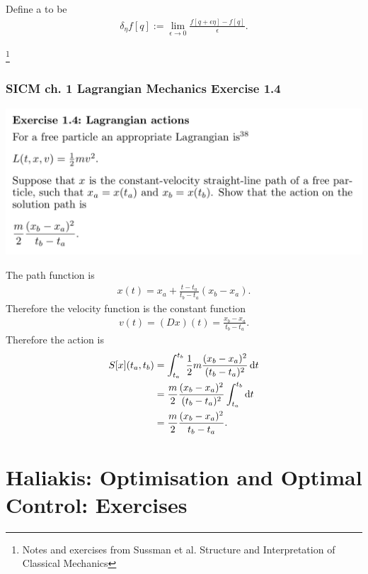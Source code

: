 Define a  to be
\begin{align*}
  \delta_{\eta}f[q] := \lim_{\epsilon \to 0} \frac{f[q + \epsilon\eta] - f[q]}{\epsilon}.
\end{align*}

\newpage
\footnote{Notes and exercises from Sussman et al. Structure and Interpretation of Classical Mechanics}
\subsubsection*{SICM ch. 1 Lagrangian Mechanics Exercise 1.4}
\begin{mdframed}
  \includegraphics[width=400pt]{img/physics--classical-mechanics--sicm--1-4.png}
\end{mdframed}
The path function is
\begin{align*}
  x(t) = x_a + \frac{t - t_a}{t_b - t_a}(x_b - x_a).
\end{align*}
Therefore the velocity function is the constant function
\begin{align*}
  v(t) = (D x)(t) = \frac{x_b - x_a}{t_b - t_a}.
\end{align*}
Therefore the action is
\begin{align*}
  S[x](t_a, t_b) &= \int_{t_a}^{t_b}  \frac{1}{2}m \frac{(x_b - x_a)^2}{(t_b - t_a)^2} \d t \\
                 &= \frac{m}{2} \frac{(x_b - x_a)^2}{(t_b - t_a)^2}\int_{t_a}^{t_b} \d t \\
                 &= \frac{m}{2} \frac{(x_b - x_a)^2}{t_b - t_a}.
\end{align*}


\section{Haliakis: Optimisation and Optimal Control: Exercises}
